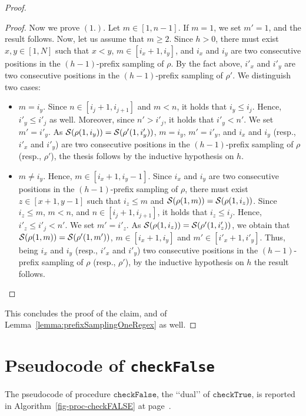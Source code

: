\begin{proof}
\begin{proof}
Now we prove $(1.)$. Let $m\in [1,n-1]$. If $m=1$, we set $m'=1$, and the result follows.
Now, let us assume that $m\geq 2$. Since $h>0$, there must exist $x,y\in [1,N]$ such that $x<y$, $m\in [i_{x}+1,i_y]$, and $i_x$ and $i_y$ are two consecutive positions in the
$(h-1)$-prefix sampling of $\rho$. By the fact above, $i'_x$ and $i'_y$ are two consecutive positions in the $(h-1)$-prefix sampling of $\rho'$. We distinguish two cases:
\begin{itemize}
\item $m=i_y$. Since $n\in [i_j+1,i_{j+1}]$ and $m<n$, it holds that $i_y\leq i_j$. Hence, $i'_y\leq i'_j$ as well. Moreover, since $n'>i'_j$, it holds that $i'_y<n'$.
We set $m'=i'_y$. As $\mathcal{S}(\rho(1,i_y))=\mathcal{S}(\rho'(1,i'_y))$, $m=i_y$, $m'=i'_y$, and $i_x$ and $i_y$ (resp., $i'_x$ and $i'_y$) are two consecutive positions in
the $(h-1)$-prefix sampling of $\rho$ (resp., $\rho'$), the thesis follows by the inductive hypothesis on $h$.
\item $m\neq i_y$. Hence, $m\in [i_x+1,i_y-1]$. Since $i_x$ and $i_y$ are two consecutive positions in the $(h-1)$-prefix sampling of $\rho$, there must exist $z\in [x+1,y-1]$
such that $i_z\leq m$ and $\mathcal{S}(\rho(1,m))=\mathcal{S}(\rho(1,i_z))$. Since $i_z\leq m$, $m<n$, and $n\in [i_j+1,i_{j+1}]$, it holds that $i_z\leq i_j$.
Hence, $i'_z\leq i'_j<n'$. We set $m'=i'_z$. As $\mathcal{S}(\rho(1,i_z))=\mathcal{S}(\rho'(1,i'_z))$, we obtain that
$\mathcal{S}(\rho(1,m))=\mathcal{S}(\rho'(1,m'))$, $m\in [i_{x}+1,i_y]$ and $m'\in [i'_x+1,i'_y]$. Thus, being  $i_x$ and $i_y$ (resp., $i'_x$ and $i'_y$)   two consecutive positions in the $(h-1)$-prefix sampling of $\rho$ (resp., $\rho'$), by the inductive hypothesis on $h$ the result follows. \qedhere
\end{itemize}
\end{proof}
This concludes the proof of the claim, and of  Lemma~\ref{lemma:prefixSamplingOneRegex} as well.
\end{proof}


\section{Pseudocode of \texttt{checkFalse}}\label{sec:chkFalse}
The pseudocode of procedure $\texttt{checkFalse}$, the \lq\lq dual\rq\rq{} of $\texttt{checkTrue}$, 
is reported in Algorithm~\ref{fig-proc-checkFALSE} at page~\pageref{fig-proc-checkFALSE}.

